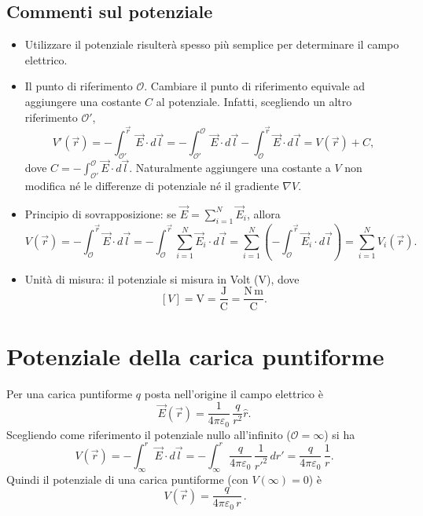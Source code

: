 \documentclass{book}
\begin{document}
\subsection*{Commenti sul potenziale}

\begin{itemize}
  \item Utilizzare il potenziale risulterà spesso più semplice per determinare il campo elettrico.
  \item Il punto di riferimento \(\mathcal{O}\). Cambiare il punto di riferimento equivale ad aggiungere una costante \(C\) al potenziale. Infatti, scegliendo un altro riferimento \(\mathcal{O}'\),
    \[
      V'(\vec{r}) = - \int_{\mathcal{O}'}^{\vec{r}} \vec{E}\cdot d\vec{l}
      = -\int_{\mathcal{O}'}^{\mathcal{O}} \vec{E}\cdot d\vec{l} -\int_{\mathcal{O}}^{\vec{r}} \vec{E}\cdot d\vec{l}
      = V(\vec{r}) + C,
    \]
    dove \(C = -\displaystyle\int_{\mathcal{O}'}^{\mathcal{O}} \vec{E}\cdot d\vec{l}\). Naturalmente aggiungere una costante a \(V\) non modifica né le differenze di potenziale né il gradiente \(\nabla V\).
  \item Principio di sovrapposizione: se \(\vec{E}=\sum_{i=1}^N \vec{E}_i\), allora
    \[
      V(\vec r) = -\int_{\mathcal{O}}^{\vec r} \vec{E}\cdot d\vec l
               = -\int_{\mathcal{O}}^{\vec r}\sum_{i=1}^N\vec{E}_i\cdot d\vec l
               = \sum_{i=1}^N \left(-\int_{\mathcal{O}}^{\vec r}\vec{E}_i\cdot d\vec l\right)
               = \sum_{i=1}^N V_i(\vec r).
    \]
  \item Unità di misura: il potenziale si misura in Volt (V), dove
    \[
      [V] = \mathrm{V} = \frac{\mathrm{J}}{\mathrm{C}} = \frac{\mathrm{N\,m}}{\mathrm{C}}.
    \]
\end{itemize}

\section{Potenziale della carica puntiforme}

Per una carica puntiforme \(q\) posta nell'origine il campo elettrico è
\[
\vec{E}(\vec r)=\frac{1}{4\pi\varepsilon_0}\,\frac{q}{r^{2}}\hat r.
\]
Scegliendo come riferimento il potenziale nullo all'infinito (\(\mathcal{O}=\infty\)) si ha
\[
V(\vec r)= -\int_{\infty}^{r} \vec{E}\cdot d\vec l
= -\int_{\infty}^{r} \frac{q}{4\pi\varepsilon_0}\,\frac{1}{r'^{2}}\,dr'
= \frac{q}{4\pi\varepsilon_0}\,\frac{1}{r}.
\]
Quindi il potenziale di una carica puntiforme (con \(V(\infty)=0\)) è
\[
\boxed{\,V(\vec r)=\dfrac{q}{4\pi\varepsilon_0\,r}\,.}
\]
\end{document}

